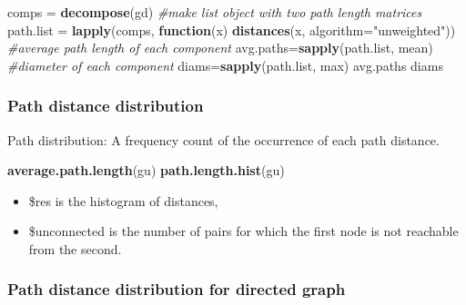 \documentclass[
]{article}
\newenvironment{Shaded}{\begin{snugshade}}{\end{snugshade}}
\newcommand{\AttributeTok}[1]{\textcolor[rgb]{0.13,0.29,0.53}{#1}}
\newcommand{\CommentTok}[1]{\textcolor[rgb]{0.56,0.35,0.01}{\textit{#1}}}
\newcommand{\ControlFlowTok}[1]{\textcolor[rgb]{0.13,0.29,0.53}{\textbf{#1}}}
\newcommand{\FunctionTok}[1]{\textcolor[rgb]{0.13,0.29,0.53}{\textbf{#1}}}
\newcommand{\NormalTok}[1]{#1}
\newcommand{\OtherTok}[1]{\textcolor[rgb]{0.56,0.35,0.01}{#1}}
\newcommand{\StringTok}[1]{\textcolor[rgb]{0.31,0.60,0.02}{#1}}
\providecommand{\tightlist}{%
  \setlength{\itemsep}{0pt}\setlength{\parskip}{0pt}}
\begin{document}
\footnotesize

\begin{Shaded}
\begin{Highlighting}[]
\NormalTok{comps }\OtherTok{=} \FunctionTok{decompose}\NormalTok{(gd)}
\CommentTok{\#make list object with two path length matrices}
\NormalTok{path.list }\OtherTok{=} \FunctionTok{lapply}\NormalTok{(comps, }\ControlFlowTok{function}\NormalTok{(x) }\FunctionTok{distances}\NormalTok{(x, }\AttributeTok{algorithm=}\StringTok{"unweighted"}\NormalTok{)) }
\CommentTok{\#average path length of each component}
\NormalTok{avg.paths}\OtherTok{=}\FunctionTok{sapply}\NormalTok{(path.list, mean) }
\CommentTok{\#diameter of each component}
\NormalTok{diams}\OtherTok{=}\FunctionTok{sapply}\NormalTok{(path.list, max) }
\NormalTok{avg.paths}
\NormalTok{diams}
\end{Highlighting}
\end{Shaded}

\normalsize

\hypertarget{path-distance-distribution}{%
\subsubsection{Path distance distribution}\label{path-distance-distribution}}

Path distribution: A frequency count of the occurrence of each path distance.

\footnotesize

\begin{Shaded}
\begin{Highlighting}[]
\FunctionTok{average.path.length}\NormalTok{(gu)}
\FunctionTok{path.length.hist}\NormalTok{(gu)}
\end{Highlighting}
\end{Shaded}

\normalsize

\begin{itemize}
\tightlist
\item
  \$res is the histogram of distances,
\item
  \$unconnected is the number of pairs for which the first node is not reachable from the second.
\end{itemize}

\hypertarget{path-distance-distribution-for-directed-graph}{%
\subsubsection{Path distance distribution for directed graph}\label{path-distance-distribution-for-directed-graph}}
\end{document}
